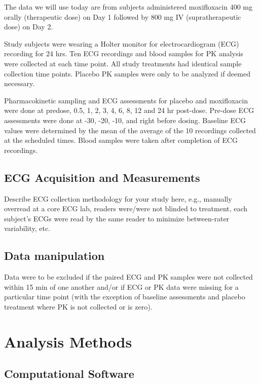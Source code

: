 \documentclass[
]{article}
\begin{document}
The data we will use today are from subjects administered moxifloxacin
400 mg orally (therapeutic dose) on Day 1 followed by 800 mg IV
(supratherapeutic dose) on Day 2.

Study subjects were wearing a Holter monitor for electrocardiogram (ECG)
recording for 24 hrs. Ten ECG recordings and blood samples for PK
analysis were collected at each time point. All study treatments had
identical sample collection time points. Placebo PK samples were only to
be analyzed if deemed necessary.

Pharmacokinetic sampling and ECG assessments for placebo and
moxifloxacin were done at predose, 0.5, 1, 2, 3, 4, 6, 8, 12 and 24 hr
post-dose. Pre-dose ECG assessments were done at -30, -20, -10, and
right before dosing. Baseline ECG values were determined by the mean of
the average of the 10 recordings collected at the scheduled times. Blood
samples were taken after completion of ECG recordings.

\hypertarget{ecg-acquisition-and-measurements}{%
\subsection{ECG Acquisition and
Measurements}\label{ecg-acquisition-and-measurements}}

Describe ECG collection methodology for your study here, e.g., manually
overread at a core ECG lab, readers were/were not blinded to treatment,
each subject's ECGs were read by the same reader to minimize
between-rater variability, etc.

\hypertarget{data-manipulation}{%
\subsection{Data manipulation}\label{data-manipulation}}

Data were to be excluded if the paired ECG and PK samples were not
collected within 15 min of one another and/or if ECG or PK data were
missing for a particular time point (with the exception of baseline
assessments and placebo treatment where PK is not collected or is zero).

\hypertarget{analysis-methods}{%
\section{Analysis Methods}\label{analysis-methods}}

\hypertarget{computational-software}{%
\subsection{Computational Software}\label{computational-software}}
\end{document}
